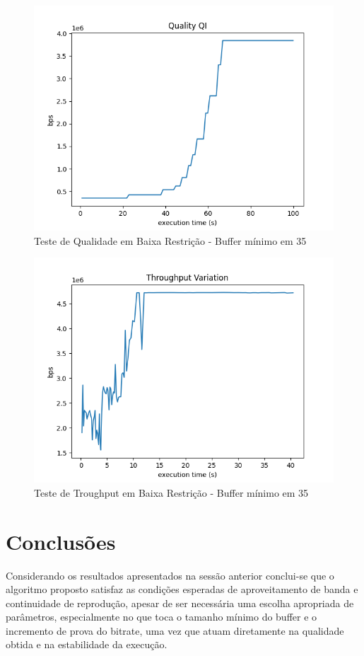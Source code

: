 \documentclass[10pt,twocolumn,letterpaper]{article}
\begin{document}
	\begin{figure}
		\centering
		\includegraphics[width=\linewidth]{playback_quality_qi35.png}
		\caption{Teste de Qualidade em Baixa Restrição - Buffer mínimo em 35}
		\label{fig:9}
	\end{figure}
	
	\begin{figure}
		\centering
		\includegraphics[width=\linewidth]{throughput35.png}
		\caption{Teste de Troughput em Baixa Restrição - Buffer mínimo em 35}
		\label{fig:10}
	\end{figure}
	\section{Conclusões}
	Considerando os resultados apresentados na sessão anterior conclui-se que o algoritmo proposto satisfaz as condições esperadas de aproveitamento de banda e continuidade de reprodução, apesar de ser necessária uma escolha apropriada de parâmetros, especialmente no que toca o tamanho mínimo do buffer e o incremento de prova do bitrate, uma vez que atuam diretamente na qualidade obtida e na estabilidade da execução. 
	
\end{document}
